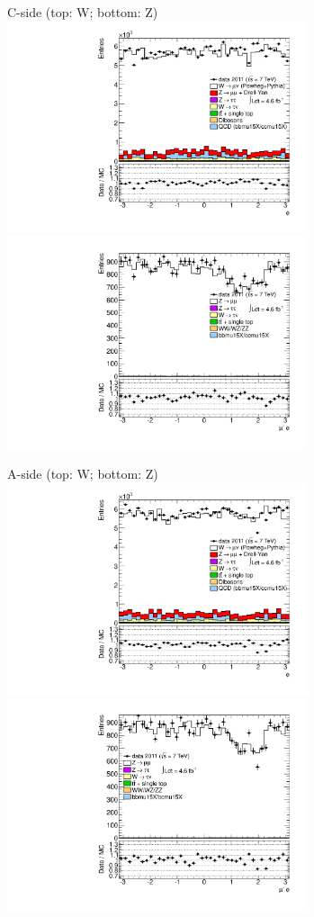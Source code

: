{

\colb[T]

C-side (top: W; bottom: Z)
\centering
\includegraphics[width=0.66\textwidth]{dates/20130306/figures/etaphi/W_7_C_stack_l_phi_NEG} \\
\includegraphics[width=0.66\textwidth]{dates/20130306/figures/etaphi/Z_7_C_stack_lN_phi_ALL.pdf}

A-side (top: W; bottom: Z)
\centering
\includegraphics[width=0.66\textwidth]{dates/20130306/figures/etaphi/W_7_A_stack_l_phi_NEG} \\
\includegraphics[width=0.66\textwidth]{dates/20130306/figures/etaphi/Z_7_A_stack_lN_phi_ALL.pdf} 

\cole
}


